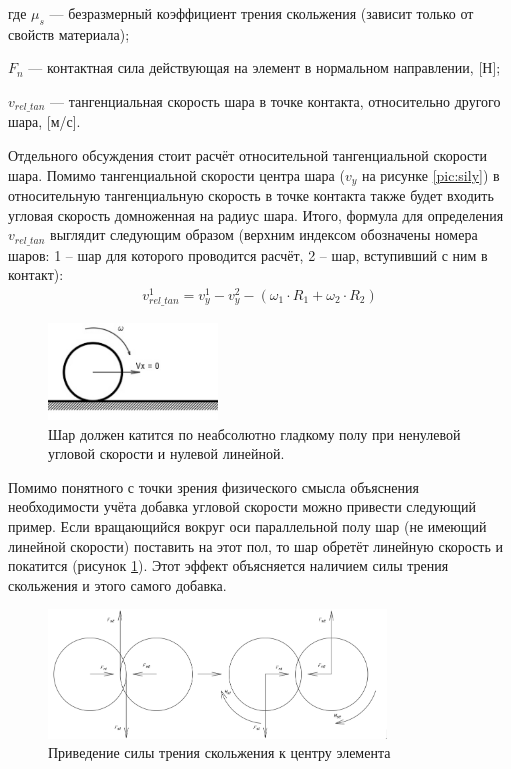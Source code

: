 \documentclass[a4paper]{article}
\begin{document}
где $\mu_s$ --- безразмерный коэффициент трения скольжения (зависит только от свойств материала);

$F_n$ --- контактная сила действующая на элемент в нормальном направлении, [Н];

$v_{rel\_tan}$ --- тангенциальная скорость шара в точке контакта, относительно другого шара, [м/с].


Отдельного обсуждения стоит расчёт относительной тангенциальной скорости шара. 
Помимо тангенциальной скорости центра шара ($v_y$ на рисунке \ref{pic:sily}) в относительную тангенциальную скорость в точке контакта также будет входить угловая скорость домноженная на радиус шара.
Итого, формула для определения $v_{rel\_tan}$ выглядит следующим образом (верхним индексом обозначены номера шаров: 1 -- шар для которого проводится расчёт, 2 -- шар, вступивший с ним в контакт):
\begin{align}
\label{rel_tan_velocity}
v_{rel\_tan}^{1} = v_{y}^{1} - v_{y}^{2} - \left( \omega_1 \cdot R_1 + \omega_2 \cdot R_2 \right)
\end{align}

\begin{figure}[h!]
	\centering
	\includegraphics[width=0.4\textwidth]{pol_omega}
	\caption{Шар должен катится по неабсолютно гладкому полу при ненулевой угловой скорости и нулевой линейной.}
	\label{pic:pol_omega}
\end{figure} 

Помимо понятного с точки зрения физического смысла объяснения необходимости учёта добавка угловой скорости можно привести следующий пример. 
Если вращающийся вокруг оси параллельной полу шар (не имеющий линейной скорости) поставить на этот пол, то шар обретёт линейную скорость и покатится (рисунок \ref{pic:pol_omega}). 
Этот эффект объясняется наличием силы трения скольжения и этого самого добавка.

\begin{figure}[h!]
	\centering
	\includegraphics[width=0.8\textwidth]{fs_ms}
	\caption{Приведение силы трения скольжения к центру элемента}
	\label{pic:fs_ms}
\end{figure} 
\end{document}
